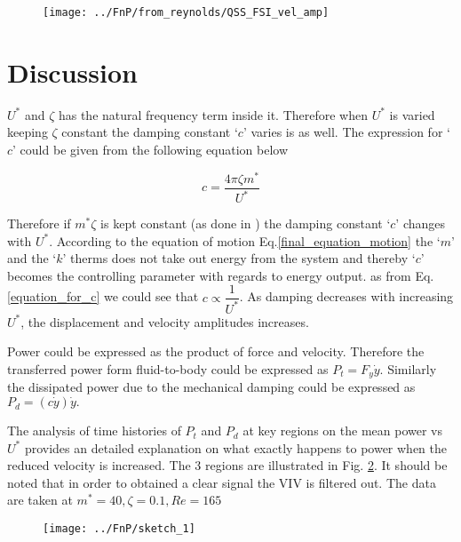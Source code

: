 \begin{figure}
\centering
\texttt{[image: ../FnP/from\_reynolds/QSS\_FSI\_vel\_amp]}
\caption{}
\label{fig:QSS_FSI_vel_amp}
\end{figure}



\section{Discussion}

$U^*$ and $\zeta$ has the natural frequency term inside it. Therefore when $U^*$ is varied keeping $\zeta$ constant the damping constant `$c$' varies is as well. The expression for `$c$' could be given from the following equation below

\begin{equation}
\label{equation_for_c}
c=\dfrac{4 \pi \zeta m^*}{U^*}
\end{equation}


Therefore if $m^*\zeta$ is kept constant (as done in \cite{Barrero-Gil2010a}) the damping constant `$c$' changes with $U^*$. According to the  equation of motion  Eq.\ref{final_equation_motion} the `$m$' and the `$k$' therms does not take out energy from the system and thereby `$c$' becomes the controlling parameter with regards to energy output. as from Eq.\ref{equation_for_c} we could see that $c\propto \dfrac{1}{U^*}$. As damping decreases with increasing $U^*$, the displacement and velocity amplitudes increases.

Power could be expressed as the product of force and velocity. Therefore the transferred power form fluid-to-body could be expressed as $P_t=F_y\dot{y}$. Similarly the dissipated power due to the mechanical damping could be expressed as $P_d=(c\dot{y})\dot{y}.$

The analysis of time histories of $P_t $ and $P_d$ at key regions on the mean power vs $U^*$ provides an detailed explanation on what exactly happens to power when the reduced velocity is increased. The 3 regions are illustrated in Fig. \ref{fig:sketch_1}. It should be noted that in order to obtained a clear signal the VIV is filtered out. The data are taken at $m^* = 40,\zeta=0.1,Re=165$ 

\begin{figure}
\centering
\texttt{[image: ../FnP/sketch\_1]}
\caption{}
\label{fig:sketch_1}
\end{figure}






